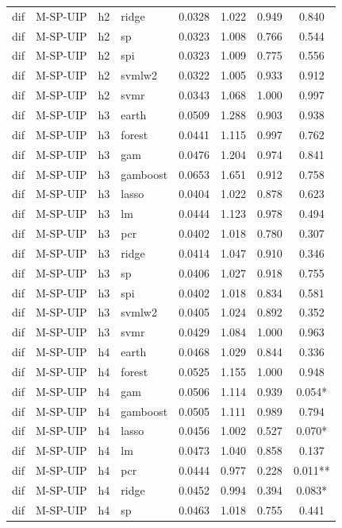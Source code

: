 \begin{ThreePartTable}
\begin{longtable}[t]{llclcccc}
dif & M-SP-UIP & h2 & ridge & 0.0328 & 1.022 & 0.949 & 0.840\\
dif & M-SP-UIP & h2 & sp & 0.0323 & 1.008 & 0.766 & 0.544\\
dif & M-SP-UIP & h2 & spi & 0.0323 & 1.009 & 0.775 & 0.556\\
dif & M-SP-UIP & h2 & svmlw2 & 0.0322 & 1.005 & 0.933 & 0.912\\
dif & M-SP-UIP & h2 & svmr & 0.0343 & 1.068 & 1.000 & 0.997\\
\addlinespace
dif & M-SP-UIP & h3 & earth & 0.0509 & 1.288 & 0.903 & 0.938\\
dif & M-SP-UIP & h3 & forest & 0.0441 & 1.115 & 0.997 & 0.762\\
dif & M-SP-UIP & h3 & gam & 0.0476 & 1.204 & 0.974 & 0.841\\
dif & M-SP-UIP & h3 & gamboost & 0.0653 & 1.651 & 0.912 & 0.758\\
dif & M-SP-UIP & h3 & lasso & 0.0404 & 1.022 & 0.878 & 0.623\\
dif & M-SP-UIP & h3 & lm & 0.0444 & 1.123 & 0.978 & 0.494\\
dif & M-SP-UIP & h3 & pcr & 0.0402 & 1.018 & 0.780 & 0.307\\
dif & M-SP-UIP & h3 & ridge & 0.0414 & 1.047 & 0.910 & 0.346\\
dif & M-SP-UIP & h3 & sp & 0.0406 & 1.027 & 0.918 & 0.755\\
dif & M-SP-UIP & h3 & spi & 0.0402 & 1.018 & 0.834 & 0.581\\
dif & M-SP-UIP & h3 & svmlw2 & 0.0405 & 1.024 & 0.892 & 0.352\\
dif & M-SP-UIP & h3 & svmr & 0.0429 & 1.084 & 1.000 & 0.963\\
\addlinespace
dif & M-SP-UIP & h4 & earth & 0.0468 & 1.029 & 0.844 & 0.336\\
dif & M-SP-UIP & h4 & forest & 0.0525 & 1.155 & 1.000 & 0.948\\
dif & M-SP-UIP & h4 & gam & 0.0506 & 1.114 & 0.939 & 0.054*\\
dif & M-SP-UIP & h4 & gamboost & 0.0505 & 1.111 & 0.989 & 0.794\\
dif & M-SP-UIP & h4 & lasso & 0.0456 & 1.002 & 0.527 & 0.070*\\
dif & M-SP-UIP & h4 & lm & 0.0473 & 1.040 & 0.858 & 0.137\\
dif & M-SP-UIP & h4 & pcr & 0.0444 & 0.977 & 0.228 & 0.011**\\
dif & M-SP-UIP & h4 & ridge & 0.0452 & 0.994 & 0.394 & 0.083*\\
dif & M-SP-UIP & h4 & sp & 0.0463 & 1.018 & 0.755 & 0.441\\

\end{longtable}
\end{ThreePartTable}
